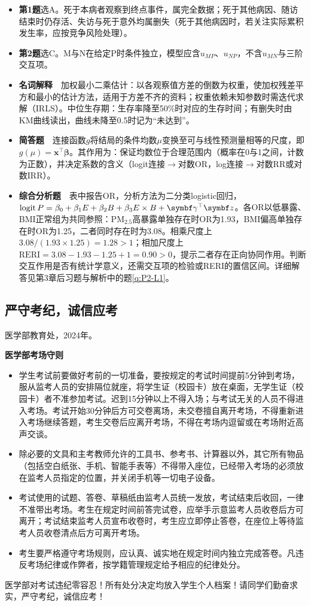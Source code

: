 \begin{fuxi}[样题答题要点]
\begin{itemize}
\item \textbf{第1题}选A。死于本病者观察到终点事件，属完全数据；死于其他病因、随访结束时仍存活、失访与死于意外均属删失（死于其他病因时，若关注实际累积发生率，应按竞争风险处理）。
\item \textbf{第2题}选C。M与N在给定P时条件独立，模型应含$u_{MP}$、$u_{NP}$，不含$u_{MN}$与三阶交互项。
\item \textbf{名词解释}　加权最小二乘估计：以各观察值方差的倒数为权重，使加权残差平方和最小的估计方法，适用于方差不齐的资料；权重依赖未知参数时需迭代求解（IRLS）。中位生存期：生存率降至50\%时对应的生存时间；有删失时由KM曲线读出，曲线未降至0.5时记为“未达到”。
\item \textbf{简答题}　连接函数$g$将结局的条件均数$\mu$变换至可与线性预测量相等的尺度，即$g(\mu)=\bm x^\top\bm\beta$。其作用为：保证均数位于合理范围内（概率在0与1之间，计数为正数），并决定系数的含义（logit连接$\to$对数OR，log连接$\to$对数RR或对数IRR）。
\item \textbf{综合分析题}　表中报告OR，分析方法为二分类logistic回归，$\logit P=\beta_0+\beta_1E+\beta_2B+\beta_3E\times B+\bm\gamma^\top\bm z$。各OR以低暴露、BMI正常组为共同参照：PM$_{2.5}$高暴露单独存在时OR为1.93，BMI偏高单独存在时OR为1.25，二者同时存在时为3.08。相乘尺度上$3.08/(1.93\times1.25)=1.28>1$；相加尺度上$\mathrm{RERI}=3.08-1.93-1.25+1=0.90>0$，提示二者存在正向协同作用。判断交互作用是否有统计学意义，还需交互项的检验或RERI的置信区间。详细解答见第3章后习题与解析中的题\ref*{q:P2-L1}。
\end{itemize}
\end{fuxi}
\subsection{严守考纪，诚信应考}
医学部教育处，2024年。

\textbf{医学部考场守则}
\begin{itemize}
\item 学生考试前要做好考前的一切准备，要按规定的考试时间提前5分钟到考场，服从监考人员的安排隔位就座，将学生证（校园卡）放在桌面，无学生证（校园卡）者不准参加考试。迟到15分钟以上不得入场；与考试无关的人员不得进入考场。考试开始30分钟后方可交卷离场，未交卷擅自离开考场，不得重新进入考场继续答题，考生交卷后应离开考场，不得在考场内逗留或在考场附近高声交谈。
\item 除必要的文具和主考教师允许的工具书、参考书、计算器以外，其它所有物品（包括空白纸张、手机、智能手表等）不得带入座位，已经带入考场的必须放在监考人员指定的位置，并关闭手机等一切电子设备。
\item 考试使用的试题、答卷、草稿纸由监考人员统一发放，考试结束后收回，一律不准带出考场。考生在规定时间前答完试卷，应举手示意监考人员收卷后方可离开；考试结束监考人员宣布收卷时，考生应立即停止答卷，在座位上等待监考人员收卷清点后方可离开考场。
\item 考生要严格遵守考场规则，应认真、诚实地在规定时间内独立完成答卷。凡违反考场纪律或作弊者，按学籍管理规定给予相应的纪律处分。
\end{itemize}
医学部对考试违纪零容忍！所有处分决定均放入学生个人档案！请同学们勤奋求实，严守考纪，诚信应考！

